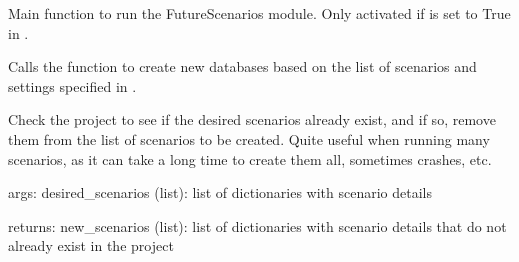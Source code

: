 \documentclass[letterpaper,10pt,english]{sphinxmanual}
\begin{document}

\begin{fulllineitems}
\label{\detokenize{WMFootprint_api:WasteAndMaterialFootprint.FutureScenarios.MakeFutureScenarios}}
\pysigstartsignatures
{}
\pysigstopsignatures
\sphinxAtStartPar
Main function to run the FutureScenarios module.
Only activated if  is set to True in .

\sphinxAtStartPar
Calls the  function to create new databases based on the list of scenarios and settings specified in .

\end{fulllineitems}


\begin{fulllineitems}
\label{\detokenize{WMFootprint_api:WasteAndMaterialFootprint.FutureScenarios.check_existing}}
\pysigstartsignatures
{}
\pysigstopsignatures
\sphinxAtStartPar
Check the project to see if the desired scenarios already exist, and if so, remove them from the list of scenarios to be created.
Quite useful when running many scenarios, as it can take a long time to create them all, sometimes crashes, etc.

\sphinxAtStartPar
args: desired\_scenarios (list): list of dictionaries with scenario details

\sphinxAtStartPar
returns: new\_scenarios (list): list of dictionaries with scenario details that do not already exist in the project

\end{fulllineitems}

\end{document}
